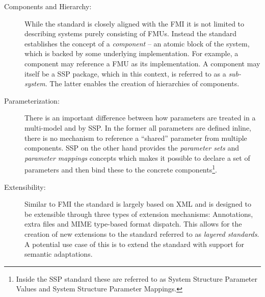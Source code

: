 \begin{description}
\item[Components and Hierarchy:]
While the standard is closely aligned with the FMI it is not limited to describing systems purely consisting of FMUs.
Instead the standard establishes the concept of a \emph{component} -- an atomic block of the system, which is backed by some underlying implementation.
For example, a component may reference a FMU as its implementation.
A component may itself be a SSP package, which in this context, is referred to as a \emph{sub-system}. 
The latter enables the creation of hierarchies of components.


\item[Parameterization:]
There is an important difference between how parameters are treated in a multi-model and by SSP.
In the former all parameters are defined inline, there is no mechanism to reference a ``shared'' parameter from multiple components.
SSP on the other hand provides the \emph{parameter sets} and \emph{parameter mappings} concepts which makes it possible to declare a set of parameters and then bind these to the concrete components\footnote{Inside the SSP standard these are referred to as System Structure Parameter Values and System Structure Parameter Mappings.}.

\item[Extensibility:]
Similar to FMI the standard is largely based on XML and is designed to be extensible through three types of extension mechanisms: Annotations, extra files and MIME type-based format dispatch.
This allows for the creation of new extensions to the standard referred to as \emph{layered standards}.
A potential use case of this is to extend the standard with support for semantic adaptations.
\end{description}




%



